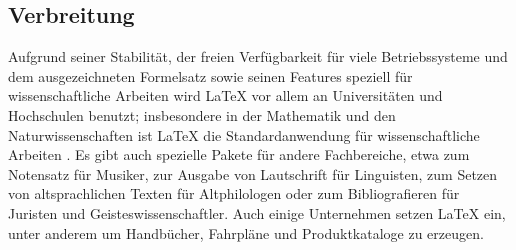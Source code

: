 \subsection{Verbreitung}

Aufgrund seiner Stabilität, der freien Verfügbarkeit für viele Betriebssysteme
und dem ausgezeichneten Formelsatz sowie seinen Features speziell für
wissenschaftliche Arbeiten wird \LaTeX{} vor allem an Universitäten und
Hochschulen benutzt; insbesondere in der Mathematik und den Naturwissenschaften
ist \LaTeX{} die Standardanwendung für wissenschaftliche Arbeiten
\cite{ctan-friends,Gaudeul06}. Es gibt auch spezielle Pakete für andere
Fachbereiche, etwa zum Notensatz für Musiker, zur Ausgabe von Lautschrift für
Linguisten, zum Setzen von altsprachlichen Texten für Altphilologen oder zum
Bibliografieren für Juristen und Geisteswissenschaftler. Auch einige
Unternehmen setzen \LaTeX{} ein, unter anderem um Handbücher, Fahrpläne und
Produktkataloge zu erzeugen.
